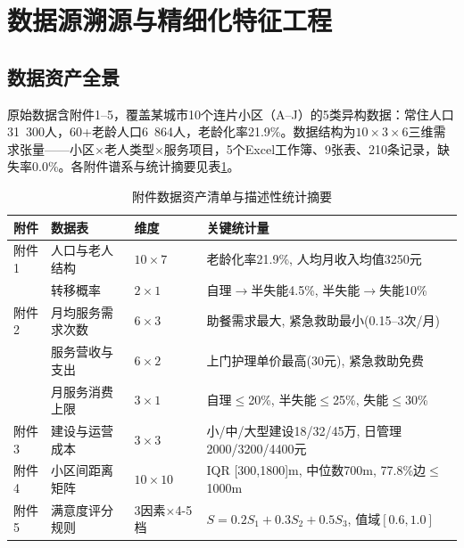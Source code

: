 
\section{数据源溯源与精细化特征工程}

\subsection{数据资产全景}

原始数据含附件1--5，覆盖某城市10个连片小区（A--J）的5类异构数据：常住人口31~300人，60+老龄人口6~864人，老龄化率21.9\%。数据结构为$10\times 3\times 6$三维需求张量——小区$\times$老人类型$\times$服务项目，5个Excel工作簿、9张表、210条记录，缺失率0.0\%。各附件谱系与统计摘要见表\ref{tab:data_inventory}。

\begin{table}[htbp]
\centering
\footnotesize
\caption{附件数据资产清单与描述性统计摘要}
\label{tab:data_inventory}
\begin{tabular}{p{1.0cm}p{3.0cm}p{1.3cm}p{5.0cm}}
\toprule
\textbf{附件} & \textbf{数据表} & \textbf{维度} & \textbf{关键统计量} \\
\midrule
附件1 & 人口与老人结构 & $10 \times 7$ & 老龄化率21.9\%, 人均月收入均值3250元 \\
       & 转移概率 & $2 \times 1$ & 自理$\to$半失能4.5\%, 半失能$\to$失能10\% \\
\midrule
附件2 & 月均服务需求次数 & $6 \times 3$ & 助餐需求最大, 紧急救助最小(0.15--3次/月) \\
       & 服务营收与支出 & $6 \times 2$ & 上门护理单价最高(30元), 紧急救助免费 \\
       & 月服务消费上限 & $3 \times 1$ & 自理$\leq$20\%, 半失能$\leq$25\%, 失能$\leq$30\% \\
\midrule
附件3 & 建设与运营成本 & $3 \times 3$ & 小/中/大型建设18/32/45万, 日管理2000/3200/4400元 \\
\midrule
附件4 & 小区间距离矩阵 & $10 \times 10$ & IQR [300,1800]m, 中位数700m, 77.8\%边$\leq$1000m \\
\midrule
附件5 & 满意度评分规则 & 3因素$\times$4-5档 & $S=0.2S_1+0.3S_2+0.5S_3$, 值域$[0.6,1.0]$ \\
\bottomrule
\end{tabular}
\end{table}

